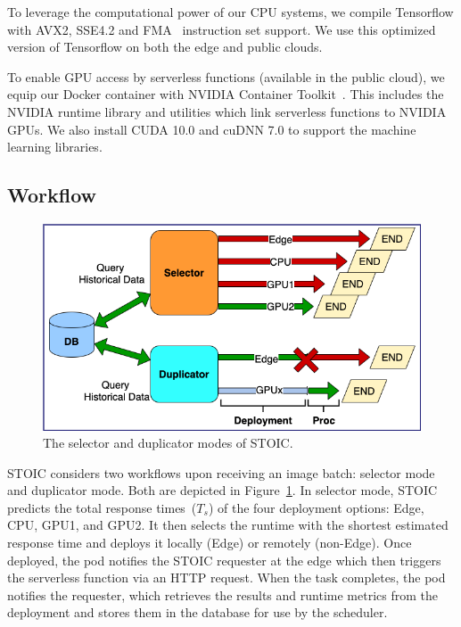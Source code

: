 To leverage the computational power of our CPU systems, we compile Tensorflow with AVX2, SSE4.2 \cite{ref:avx} and FMA~\cite{ref:fma} instruction set support. We use this optimized version of Tensorflow on both the edge and public clouds.
 
To enable GPU access by serverless functions (available in the public cloud), we equip our Docker container with NVIDIA Container Toolkit~\cite{ref:nvidia}. This includes the NVIDIA runtime library and utilities which link serverless functions to NVIDIA GPUs. We also install CUDA 10.0 and cuDNN 7.0 to support the machine learning libraries.
 
 
 \subsection{Workflow}

\begin{figure}[t] \centering 
\includegraphics[scale=0.33]{figures/selector_duplicator.png}
\caption{The selector and duplicator modes of STOIC. 
\label{fig:duplicator}}
\end{figure}


STOIC considers two workflows upon receiving an image batch: 
selector mode and duplicator mode. Both are depicted in Figure~\ref{fig:duplicator}. In selector mode, STOIC predicts the total response times~($T_s$) of the four deployment options: Edge, CPU, GPU1, and GPU2.  It then selects the runtime with the shortest estimated response time and deploys it locally (Edge) or remotely (non-Edge). Once deployed, the pod notifies the STOIC requester at the edge which then triggers the serverless function via an HTTP request. When the task completes, the pod notifies the requester, which retrieves the results and runtime metrics from the deployment and stores them in the database for use by the scheduler.

